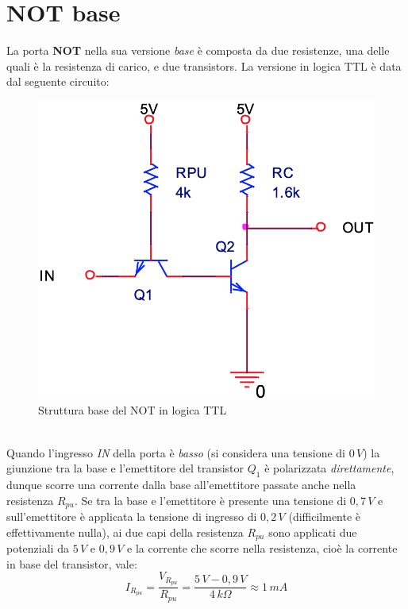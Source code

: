 \documentclass[12pt, a4paper]{report}
\begin{document}
\section{NOT base}
La porta \textbf{NOT} nella sua versione \textit{base} è composta da due resistenze, una delle quali è la resistenza di carico, e due transistors. La versione in logica TTL è data dal seguente circuito:
\begin{figure}[h]
    \centering
    \includegraphics[scale=0.4,angle=0]{ttl_not_base.png}
    \caption{Struttura base del NOT in logica TTL}
    \label{not_base}
\end{figure}
\\Quando l'ingresso \textit{IN} della porta è \textit{basso} (si considera una tensione di $0\,V$) la giunzione tra la base e l'emettitore del transistor $Q_1$ è polarizzata \textit{direttamente}, dunque scorre una corrente dalla base all'emettitore passate anche nella resistenza $R_{pu}$. Se tra la base e l'emettitore è presente una tensione di $0,7\,V$ e sull'emettitore è applicata la tensione di ingresso di $0,2\,V$ (difficilmente è effettivamente nulla), ai due capi della resistenza $R_{pu}$ sono applicati due potenziali da $5\,V$ e $0,9\,V$ e la corrente che scorre nella resistenza, cioè la corrente in base del transistor, vale:
\begin{equation}
    I_{R_{pu}} = \frac{V_{R_{pu}}}{{R_{pu}}} = \frac{5\,V - 0,9\,V}{4\,k\Omega} \approx 1\,mA
    \label{i_rpu}
\end{equation}
\end{document}
